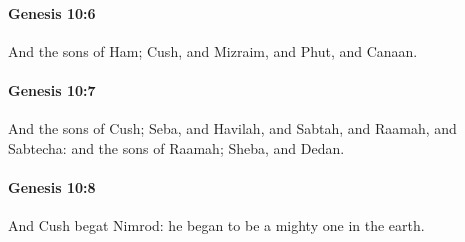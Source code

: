		\paragraph{Genesis 10:6} %
			\label{GENESIS-10-6}

			And the sons of Ham; Cush, and Mizraim, and Phut, and Canaan.


		\paragraph{Genesis 10:7} %
			\label{GENESIS-10-7}

			And the sons of Cush; Seba, and Havilah, and Sabtah, and Raamah, and Sabtecha: and the sons of Raamah; Sheba, and Dedan.


		\paragraph{Genesis 10:8} %
			\label{GENESIS-10-8}

			And Cush begat Nimrod: he began to be a mighty one in the earth.



